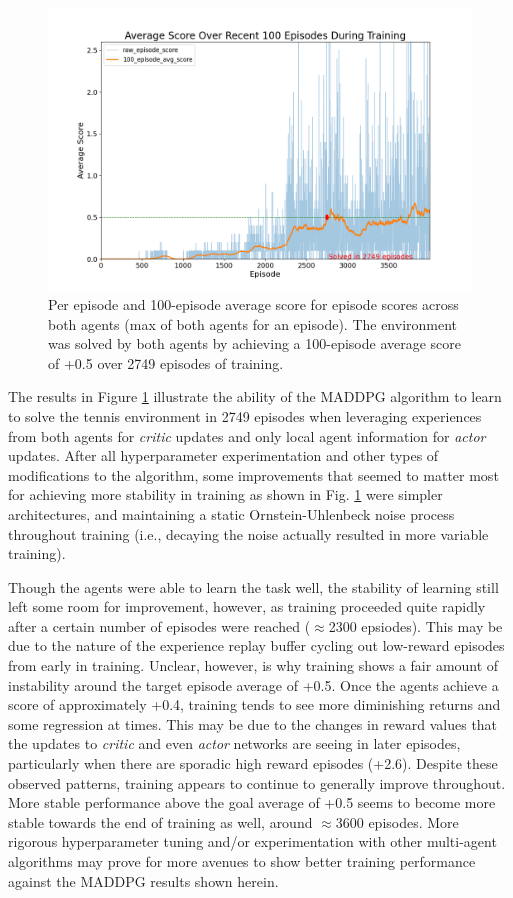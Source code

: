 \documentclass[11pt]{article}
\begin{document}
	\begin{figure}[!ht]
		\centering
		\includegraphics[width=0.75\linewidth]{images/training.png}
		\caption{Per episode and 100-episode average score for episode scores across both agents (max of both agents for an episode). The environment was solved by both agents by achieving a 100-episode average score of +0.5 over 2749 episodes of training.}
		\label{fig:maddpg-results}
	\end{figure}
	
	\FloatBarrier
	
	The results in Figure \ref{fig:maddpg-results} illustrate the ability of the MADDPG algorithm to learn to solve the tennis environment in 2749 episodes when leveraging experiences from both agents for \textit{critic} updates and only local agent information for \textit{actor} updates. After all hyperparameter experimentation and other types of modifications to the algorithm, some improvements that seemed to matter most for achieving more stability in training as shown in Fig. \ref{fig:maddpg-results} were simpler architectures, and maintaining a static Ornstein-Uhlenbeck noise process throughout training (i.e., decaying the noise actually resulted in more variable training).
		
	 Though the agents were able to learn the task well, the stability of learning still left some room for improvement, however, as training proceeded quite rapidly after a certain number of episodes were reached ($\approx$2300 epsiodes). This may be due to the nature of the experience replay buffer cycling out low-reward episodes from early in training. Unclear, however, is why training shows a fair amount of instability around the target episode average of +0.5. Once the agents achieve a score of approximately +0.4, training tends to see more diminishing returns and some regression at times. This may be due to the changes in reward values that the updates to \textit{critic} and even \textit{actor} networks are seeing in later episodes, particularly when there are sporadic high reward episodes (+2.6). Despite these observed patterns, training appears to continue to generally improve throughout. More stable performance above the goal average of +0.5 seems to become more stable towards the end of training as well, around $\approx$3600 episodes. More rigorous hyperparameter tuning and/or experimentation with other multi-agent algorithms may prove for more avenues to show better training performance against the MADDPG results shown herein.
	
\end{document}
